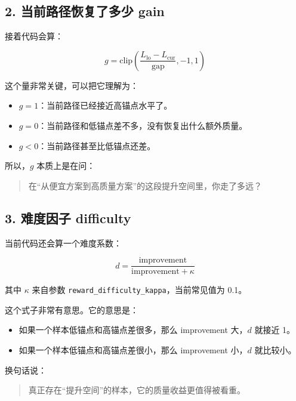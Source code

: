 \documentclass[12pt]{ctexart}
\begin{document}
\subsection{2. 当前路径恢复了多少 gain}

接着代码会算：

\begin{equation}
    g = \text{clip}\left(\frac{L_{\text{lo}} - L_{\text{cur}}}{\text{gap}}, -1, 1\right)
\end{equation}

这个量非常关键，可以把它理解为：

\begin{itemize}
    \item $g = 1$：当前路径已经接近高锚点水平了。
    \item $g = 0$：当前路径和低锚点差不多，没有恢复出什么额外质量。
    \item $g < 0$：当前路径甚至比低锚点还差。
\end{itemize}

所以，$g$ 本质上是在问：

\begin{quote}
    在“从便宜方案到高质量方案”的这段提升空间里，你走了多远？
\end{quote}

\subsection{3. 难度因子 difficulty}

当前代码还会算一个难度系数：

\begin{equation}
    d = \frac{\text{improvement}}{\text{improvement} + \kappa}
\end{equation}

其中 $\kappa$ 来自参数 \texttt{reward\_difficulty\_kappa}，当前常见值为 0.1。

这个式子非常有意思。它的意思是：

\begin{itemize}
    \item 如果一个样本低锚点和高锚点差很多，那么 improvement 大，$d$ 就接近 1。
    \item 如果一个样本低锚点和高锚点差很小，那么 improvement 小，$d$ 就比较小。
\end{itemize}

换句话说：

\begin{quote}
    真正存在“提升空间”的样本，它的质量收益更值得被看重。
\end{quote}
\end{document}
